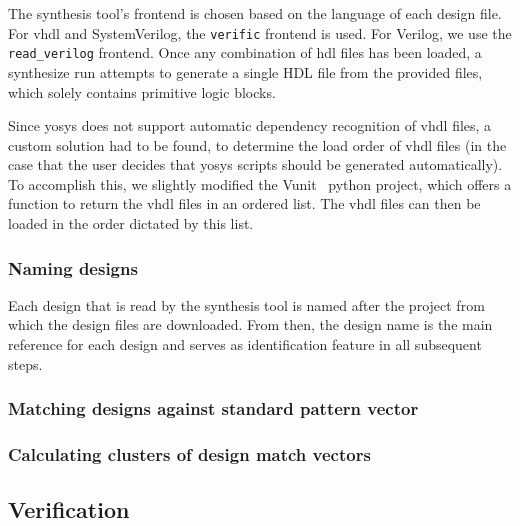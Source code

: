The synthesis tool's frontend is chosen based on the language of each design file.
For \gls{vhdl} and SystemVerilog, the \lstinline{verific} frontend is used. For Verilog,
we use the \lstinline{read_verilog} frontend. Once any combination of \gls{hdl} files
has been loaded, a synthesize run attempts to generate a single HDL file from the provided
files, which solely contains primitive logic blocks. 

Since yosys does not support automatic dependency recognition of vhdl files, a custom solution
had to be found, to determine the load order of vhdl files (in the case that the user decides
that yosys scripts should be generated automatically). To accomplish this, we slightly modified 
the Vunit~\autocite{VUnit} python project, which offers a function to return the \gls{vhdl} 
files in an ordered list. The vhdl files can then be loaded in the order dictated by this list.  

\subsubsection{Naming designs} 
Each design that is read by the synthesis tool is named after the project from
which the design files are downloaded. From then, the design name is the main
reference for each design and serves as identification feature in all
subsequent steps.

\subsubsection{Matching designs against standard pattern vector}
\subsubsection{Calculating clusters of design match vectors}

\subsection{Verification}



